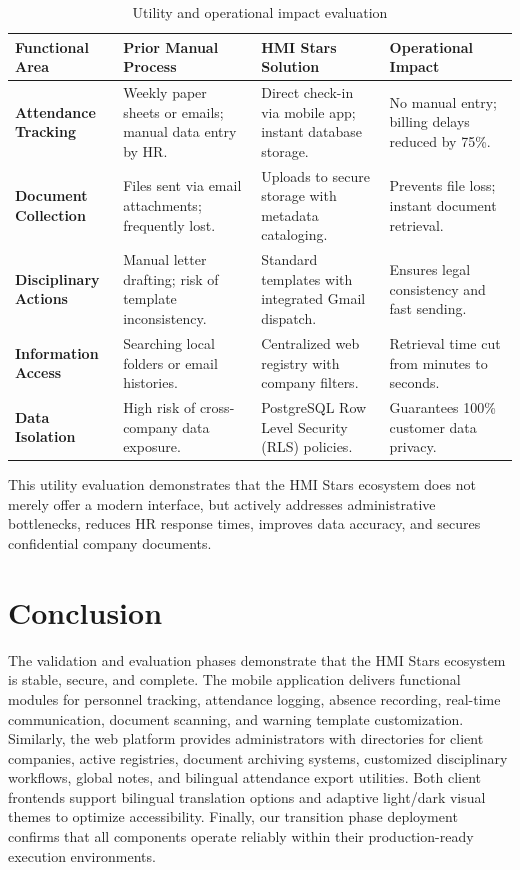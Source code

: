 \begin{table}[H]
\centering
\caption{Utility and operational impact evaluation}
\label{tab:utility_eval}
\begin{tabular}{|p{3cm}|p{3.8cm}|p{4.2cm}|p{3.8cm}|}
\hline
\textbf{Functional Area} & \textbf{Prior Manual Process} & \textbf{HMI Stars Solution} & \textbf{Operational Impact} \\
\hline
\textbf{Attendance Tracking} & Weekly paper sheets or emails; manual data entry by HR. & Direct check-in via mobile app; instant database storage. & No manual entry; billing delays reduced by 75\%. \\
\hline
\textbf{Document Collection} & Files sent via email attachments; frequently lost. & Uploads to secure storage with metadata cataloging. & Prevents file loss; instant document retrieval. \\
\hline
\textbf{Disciplinary Actions} & Manual letter drafting; risk of template inconsistency. & Standard templates with integrated Gmail dispatch. & Ensures legal consistency and fast sending. \\
\hline
\textbf{Information Access} & Searching local folders or email histories. & Centralized web registry with company filters. & Retrieval time cut from minutes to seconds. \\
\hline
\textbf{Data Isolation} & High risk of cross-company data exposure. & PostgreSQL Row Level Security (RLS) policies. & Guarantees 100\% customer data privacy. \\
\hline
\end{tabular}
\end{table}

This utility evaluation demonstrates that the HMI Stars ecosystem does not merely offer a modern interface, but actively addresses administrative bottlenecks, reduces HR response times, improves data accuracy, and secures confidential company documents.

\section{Conclusion}
The validation and evaluation phases demonstrate that the HMI Stars ecosystem is stable, secure, and complete. The mobile application delivers functional modules for personnel tracking, attendance logging, absence recording, real-time communication, document scanning, and warning template customization. Similarly, the web platform provides administrators with directories for client companies, active registries, document archiving systems, customized disciplinary workflows, global notes, and bilingual attendance export utilities. Both client frontends support bilingual translation options and adaptive light/dark visual themes to optimize accessibility. Finally, our transition phase deployment confirms that all components operate reliably within their production-ready execution environments.

